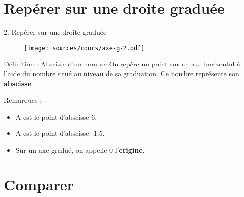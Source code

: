 \documentclass{beamer}
\begin{document}
\section{Repérer sur une droite graduée}
\frame{\tableofcontents[sectionstyle=show/shaded, subsectionstyle=show/shaded]}

\begin{frame}
  2. Repérer sur une droite graduée

  \begin{figure}[h!]
    \centering
    \texttt{[image: sources/cours/axe-g-2.pdf]}
  \end{figure}

  \begin{alertblock}{Définition : Abscisse d'un nombre}	
    On repère un point sur un axe horizontal à l'aide du nombre situé au niveau de sa graduation. Ce nombre représente son \textbf{abscisse}.
  \end{alertblock}

  \begin{exampleblock}{Remarques :}	
    \begin{itemize}
    \item A est le point d'abscisse 6.
    \item A est le point d'abscisse -1.5.
    \item Sur un axe gradué, on appelle 0 l'\textbf{origine}.
    \end{itemize}
  \end{exampleblock}
\end{frame}

\section{Comparer}
\frame{\tableofcontents[sectionstyle=show/shaded, subsectionstyle=show/shaded]}
\end{document}
